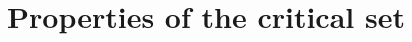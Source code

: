 \documentclass[a4paper,11pt]{article}
\newtheorem{quest}{\bf Question}
\theoremstyle{definition}
\def\RR{{\mathbb R}}
\def\la{\lambda}
\def\ga{\gamma}
\def\si{\sigma}
\begin{document}




 











\section{Properties of the critical set}\label{sec:properties}  
\label{s.properties}


\end{document}
